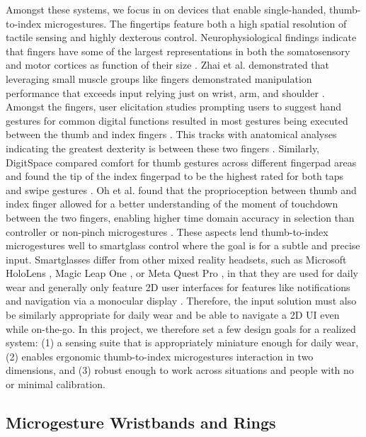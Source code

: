 \documentclass [11pt, proquest] {uwthesis}[2020/02/24]
\begin{document}
Amongst these systems, we focus in on devices that enable single-handed, thumb-to-index microgestures.  The fingertips feature both a high spatial resolution of tactile sensing and highly dexterous control. Neurophysiological findings indicate that fingers have some of the largest representations in both the somatosensory and motor cortices as function of their size \cite{schott1993penfield}.  Zhai et al. demonstrated that leveraging small muscle groups like fingers demonstrated manipulation performance that exceeds input relying just on wrist, arm, and shoulder \cite{zhai1996influence}. Amongst the fingers, user elicitation studies prompting users to suggest hand gestures for common digital functions resulted in most gestures being executed between the thumb and index fingers \cite{chan2016user}. This tracks with  anatomical analyses indicating the greatest dexterity is between these two fingers \cite{wolf2011taxonomy,li2007coordination, kuo2009functional}. Similarly, DigitSpace compared comfort for thumb gestures across different fingerpad areas and found the tip of the index fingerpad to be the highest rated for both taps and swipe gestures \cite{huang2016digitspace}. Oh et al. found  that the proprioception between thumb and index finger allowed for a better understanding of the moment of touchdown between the two fingers, enabling higher time domain accuracy in selection than controller or non-pinch microgestures \cite{oh2020finger}. These aspects lend thumb-to-index microgestures well to smartglass control where the goal is for a subtle and precise input. Smartglasses differ from other mixed reality headsets, such as Microsoft HoloLens \cite{microsoft}, Magic Leap One \cite{magicleap}, or Meta Quest Pro \cite{metaquestpro}, in that they are used for daily wear and generally only feature 2D user interfaces for features like notifications and navigation via a monocular display \cite{Carman2019-north, vuzix, nreal}. Therefore, the input solution must also be similarly appropriate for daily wear and be able to navigate a 2D UI even while on-the-go. In this project, we therefore set a few design goals for a realized system: (1) a sensing suite that is appropriately miniature enough for daily wear, (2) enables ergonomic thumb-to-index microgestures interaction in two dimensions, and (3) robust enough to work across situations and people with no or minimal calibration. 


\subsection{Microgesture Wristbands and Rings}
\end{document}
